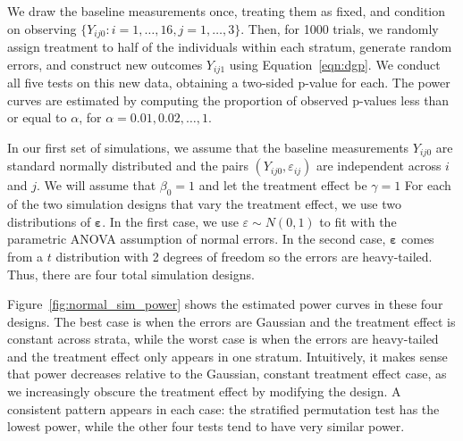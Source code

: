 \documentclass[11pt]{article}
\begin{document}
\noindent We draw the baseline measurements once, treating them as fixed, and condition on observing $\{ Y_{ij0} : {i = 1,\dots,16, j = 1,\dots, 3}\}$.
Then, for 1000 trials, we randomly assign treatment to half of the individuals within each stratum, generate random errors, and construct new outcomes $Y_{ij1}$ using Equation~\ref{eqn:dgp}.
We conduct all five tests on this new data, obtaining a two-sided p-value for each.
The power curves are estimated by computing the proportion of observed p-values less than or equal to $\alpha$, for $\alpha = 0.01, 0.02, \dots, 1$.

In our first set of simulations, we assume that the baseline measurements $Y_{ij0}$ are standard normally distributed and the pairs $(Y_{ij0}, \varepsilon_{ij})$ are independent across $i$ and $j$.
We will assume that $\beta_0 = 1$ and let the treatment effect be $\gamma = 1$
For each of the two simulation designs that vary the treatment effect, we use two distributions of $\mathbf{\varepsilon}$.
In the first case, we use $\varepsilon \sim N(0, 1)$ to fit with the parametric ANOVA assumption of normal errors.
In the second case, $\mathbf{\varepsilon}$ comes from a $t$ distribution with 2 degrees of freedom so the errors are heavy-tailed.
Thus, there are four total simulation designs.

Figure~\ref{fig:normal_sim_power} shows the estimated power curves in these four designs.
The best case is when the errors are Gaussian and the treatment effect is constant across strata, while the worst case is when the errors are heavy-tailed and the treatment effect only appears in one stratum.
Intuitively, it makes sense that power decreases relative to the Gaussian, constant treatment effect case, as we increasingly obscure the treatment effect by modifying the design.
A consistent pattern appears in each case: the stratified permutation test has the lowest power, while the other four tests tend to have very similar power.
\end{document}
